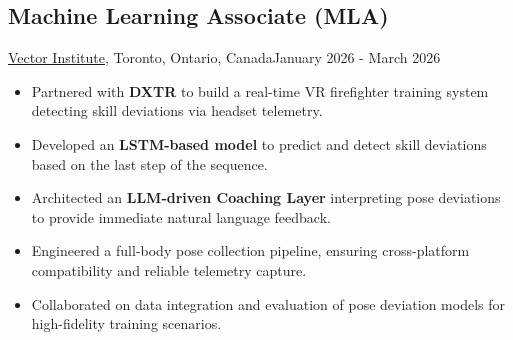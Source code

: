 \subsection{Machine Learning Associate (MLA)}{\href{https://vectorinstitute.ai/}{Vector Institute}, Toronto, Ontario, Canada}{January 2026 - March 2026}
\begin{itemize}
    \item Partnered with \textbf{DXTR} to build a real-time VR firefighter training system detecting skill deviations via headset telemetry.
    \item Developed an \textbf{LSTM-based model} to predict and detect skill deviations based on the last step of the sequence.
    \item Architected an \textbf{LLM-driven Coaching Layer} interpreting pose deviations to provide immediate natural language feedback.
    \item Engineered a full-body pose collection pipeline, ensuring cross-platform compatibility and reliable telemetry capture.
    \item Collaborated on data integration and evaluation of pose deviation models for high-fidelity training scenarios.
\end{itemize}
